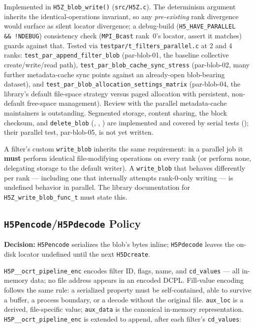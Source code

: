 \documentclass[../RFC-HDFG-2026-003.tex]{subfiles}
\begin{document}

Implemented in \texttt{H5Z\_blob\_write()} (\texttt{src/H5Z.c}). The
determinism argument inherits the identical-operations invariant, so
any \emph{pre-existing} rank divergence would surface as silent locator
divergence; a debug-build (\texttt{H5\_HAVE\_PARALLEL \&\&\ !NDEBUG})
consistency check (\texttt{MPI\_Bcast} rank~0's locator, assert it
matches) guards against that. Tested via
\texttt{testpar/t\_filters\_parallel.c} at 2 and 4 ranks:
\texttt{test\_par\_append\_filter\_blob} (par-blob-01, the baseline
collective create/write/read path), \texttt{test\_par\_blob\_cache\_sync\_stress}
(par-blob-02, many further metadata-cache sync points against an
already-open blob-bearing dataset), and
\texttt{test\_par\_blob\_allocation\_settings\_matrix} (par-blob-04, the
library's default file-space strategy versus paged allocation with
persistent, non-default free-space management). Review with the
parallel metadata-cache maintainers is outstanding.  Segmented storage,
content sharing, the block checksum, and \texttt{delete\_blob}
(, ,
) are implemented and covered by serial tests
(); their parallel test, par-blob-05, is not
yet written.


A filter's custom \texttt{write\_blob} inherits the same requirement:
in a parallel job it \textbf{must} perform identical file-modifying
operations on every rank (or perform none, delegating storage to the
default writer). A \texttt{write\_blob} that behaves differently per
rank --- including one that internally attempts rank-0-only writing ---
is undefined behavior in parallel. The library documentation for
\texttt{H5Z\_write\_blob\_func\_t} must state this.

\subsection{\texttt{H5Pencode}/\texttt{H5Pdecode} Policy}
\label{sec:blob-encode-decode}

\noindent\textbf{Decision:} \texttt{H5Pencode} serializes the blob's
bytes inline; \texttt{H5Pdecode} leaves the on-disk locator undefined
until the next \texttt{H5Dcreate}.

\texttt{H5P\_\_ocrt\_pipeline\_enc} encodes filter ID, flags, name, and
\texttt{cd\_values} --- all in-memory data; no file address appears in
an encoded DCPL. Fill-value encoding follows the same rule: a serialized
property must be self-contained, able to survive a buffer, a process
boundary, or a decode without the original file. \texttt{aux\_loc} is a
derived, file-specific value; \texttt{aux\_data} is the canonical
in-memory representation. \texttt{H5P\_\_ocrt\_pipeline\_enc} is
extended to append, after each filter's \texttt{cd\_values}:
\end{document}
